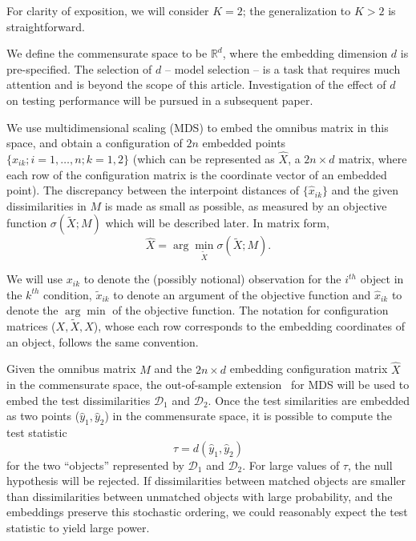 \documentclass[12pt]{article} %
\newenvironment{remark}[1][Remark]{\begin{trivlist}
\item[\hskip \labelsep {\bfseries #1}]}{\end{trivlist}}
\begin{document}
\begin{remark}
For clarity of exposition, we will consider $K=2$; the generalization to $K>2$ is straightforward. 
\end{remark}

We define the commensurate space to be  $\mathbb{R}^d$, where the embedding dimension $d$ is pre-specified. The selection of $d$ -- model selection -- is  a task that requires much attention and is  beyond the scope of this article. Investigation of the effect of $d$ on testing performance will be pursued in a  subsequent paper.

 We use multidimensional scaling (MDS) \cite{borg+groenen:1997} to embed  the omnibus matrix in this  space, and obtain  a configuration of $2n$ embedded points $\{\hat{x}_{ik}; i=1,\ldots,n;k=1,2\}$ (which can be represented as $\hat{X}$, a $2n \times d$ matrix, where each row of the configuration matrix is the coordinate vector of an embedded point). The discrepancy between the interpoint distances of $\{\hat{x}_{ik}\}$ and the given dissimilarities in  $M$ is made as small  as possible, as measured by an objective function $\sigma(\widetilde{X};M)$ which will be described later. In matrix form, $$ \hat{X}=\arg \min_{\widetilde{X}} \sigma(\widetilde{X};M).$$ 

\begin{remark} 
We will use $x_{ik}$ to denote the (possibly notional)  observation  for the $i^{th}$ object in the $k^{th}$ condition, $\tilde{x}_{ik}$ to denote an argument of the objective function  and  $\hat{x}_{ik}$  to denote the $\arg\min$  of the objective function. The notation for configuration matrices ($X,\widetilde{X},\hat{X}$), whose each row  corresponds to  the embedding coordinates of an object, follows the  same convention.
\end{remark}

  Given the omnibus matrix $M$ and the $2n \times d$ embedding configuration matrix $\hat{X}$ in the commensurate space, the out-of-sample extension~\cite{TrossetOOS} for MDS will be used to embed the test dissimilarities $\mathcal{D}_1$ and $\mathcal{D}_2$.  Once the test similarities are embedded as two points ($\hat{y}_{1},\hat{y}_{2}$) in  the commensurate space, it is possible to  compute the test statistic \[
\tau=d\left(\hat{y}_{1},\hat{y}_{2}\right)\label{teststat}
\] for the two ``objects'' represented by  $\mathcal{D}_1$ and $\mathcal{D}_2$.  For large values of $\tau$, the null hypothesis will be rejected. 
   If  dissimilarities between matched objects are smaller than dissimilarities between unmatched objects with large probability, and the embeddings preserve this stochastic ordering,  we could reasonably expect the test statistic to yield large  power. 
\end{document}
